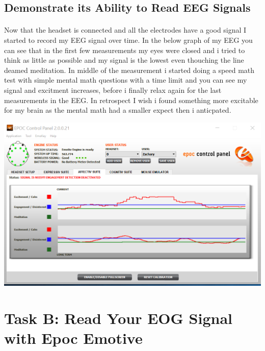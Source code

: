 \documentclass[12pt]{article}
\begin{document}
		\subsection{Demonstrate its Ability to Read EEG Signals}
			\paragraph{}
				Now that the headset is connected and all the electrodes have a good signal I started to record my EEG signal over time.  In the below graph of my EEG you can see that in 
				the first few measurements my eyes were closed and i tried to think as little as 
				possible and my signal is the lowest even thouching the line deamed meditation.  In 
				middle of the measurement i started doing a speed math test with simple mental math 
				questions with a time limit and you can see my signal and excitment increases, before 
				i finally relax again for the last measurements in the EEG.  In retrospect I wish i 
				found something more excitable for my brain as the mental math had a smaller expect 
				then i anticpated.

				\begin{center}
					\includegraphics[scale=0.4]{EEG.png}\\
 				\end{center}
	
	\section{Task B: Read Your EOG Signal with Epoc Emotive}
\end{document}
